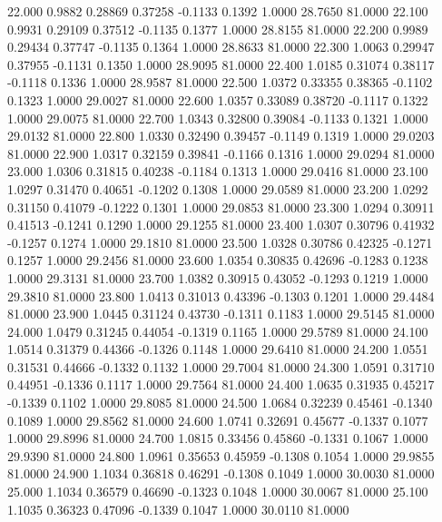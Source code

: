   22.000   0.9882   0.28869   0.37258  -0.1133   0.1392   1.0000  28.7650  81.0000
  22.100   0.9931   0.29109   0.37512  -0.1135   0.1377   1.0000  28.8155  81.0000
  22.200   0.9989   0.29434   0.37747  -0.1135   0.1364   1.0000  28.8633  81.0000
  22.300   1.0063   0.29947   0.37955  -0.1131   0.1350   1.0000  28.9095  81.0000
  22.400   1.0185   0.31074   0.38117  -0.1118   0.1336   1.0000  28.9587  81.0000
  22.500   1.0372   0.33355   0.38365  -0.1102   0.1323   1.0000  29.0027  81.0000
  22.600   1.0357   0.33089   0.38720  -0.1117   0.1322   1.0000  29.0075  81.0000
  22.700   1.0343   0.32800   0.39084  -0.1133   0.1321   1.0000  29.0132  81.0000
  22.800   1.0330   0.32490   0.39457  -0.1149   0.1319   1.0000  29.0203  81.0000
  22.900   1.0317   0.32159   0.39841  -0.1166   0.1316   1.0000  29.0294  81.0000
  23.000   1.0306   0.31815   0.40238  -0.1184   0.1313   1.0000  29.0416  81.0000
  23.100   1.0297   0.31470   0.40651  -0.1202   0.1308   1.0000  29.0589  81.0000
  23.200   1.0292   0.31150   0.41079  -0.1222   0.1301   1.0000  29.0853  81.0000
  23.300   1.0294   0.30911   0.41513  -0.1241   0.1290   1.0000  29.1255  81.0000
  23.400   1.0307   0.30796   0.41932  -0.1257   0.1274   1.0000  29.1810  81.0000
  23.500   1.0328   0.30786   0.42325  -0.1271   0.1257   1.0000  29.2456  81.0000
  23.600   1.0354   0.30835   0.42696  -0.1283   0.1238   1.0000  29.3131  81.0000
  23.700   1.0382   0.30915   0.43052  -0.1293   0.1219   1.0000  29.3810  81.0000
  23.800   1.0413   0.31013   0.43396  -0.1303   0.1201   1.0000  29.4484  81.0000
  23.900   1.0445   0.31124   0.43730  -0.1311   0.1183   1.0000  29.5145  81.0000
  24.000   1.0479   0.31245   0.44054  -0.1319   0.1165   1.0000  29.5789  81.0000
  24.100   1.0514   0.31379   0.44366  -0.1326   0.1148   1.0000  29.6410  81.0000
  24.200   1.0551   0.31531   0.44666  -0.1332   0.1132   1.0000  29.7004  81.0000
  24.300   1.0591   0.31710   0.44951  -0.1336   0.1117   1.0000  29.7564  81.0000
  24.400   1.0635   0.31935   0.45217  -0.1339   0.1102   1.0000  29.8085  81.0000
  24.500   1.0684   0.32239   0.45461  -0.1340   0.1089   1.0000  29.8562  81.0000
  24.600   1.0741   0.32691   0.45677  -0.1337   0.1077   1.0000  29.8996  81.0000
  24.700   1.0815   0.33456   0.45860  -0.1331   0.1067   1.0000  29.9390  81.0000
  24.800   1.0961   0.35653   0.45959  -0.1308   0.1054   1.0000  29.9855  81.0000
  24.900   1.1034   0.36818   0.46291  -0.1308   0.1049   1.0000  30.0030  81.0000
  25.000   1.1034   0.36579   0.46690  -0.1323   0.1048   1.0000  30.0067  81.0000
  25.100   1.1035   0.36323   0.47096  -0.1339   0.1047   1.0000  30.0110  81.0000
